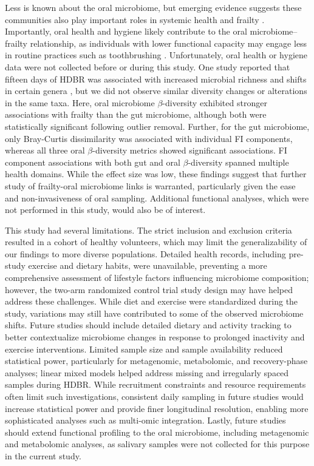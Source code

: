 \documentclass[preprint,12pt,authoryear]{elsarticle}
\begin{document}
    Less is known about the oral microbiome, but emerging evidence suggests these communities also play important roles in systemic health and frailty \citep{scannapiecoOralInflammationInfection2016, heOralMicrobiomeDiversity2015, declercqOralMicrobialSignatures2024}. Importantly, oral health and hygiene likely contribute to the oral microbiome–frailty relationship, as individuals with lower functional capacity may engage less in routine practices such as toothbrushing \citep{dibelloOralFrailtyIts2021}. Unfortunately, oral health or hygiene data were not collected before or during this study. One study reported that fifteen days of HDBR was associated with increased microbial richness and shifts in certain genera \citep{zhuEffect15Days2024}, but we did not observe similar diversity changes or alterations in the same taxa. Here, oral microbiome $\beta$-diversity exhibited stronger associations with frailty than the gut microbiome, although both were statistically significant following outlier removal. Further, for the gut microbiome, only Bray-Curtis dissimilarity was associated with individual FI components, whereas all three oral $\beta$-diversity metrics showed significant associations. FI component associations with both gut and oral $\beta$-diversity spanned multiple health domains. While the effect size was low, these findings suggest that further study of frailty-oral microbiome links is warranted, particularly given the ease and non-invasiveness of oral sampling. Additional functional analyses, which were not performed in this study, would also be of interest.
    
    This study had several limitations. The strict inclusion and exclusion criteria resulted in a cohort of healthy volunteers, which may limit the generalizability of our findings to more diverse populations. Detailed health records, including pre-study exercise and dietary habits, were unavailable, preventing a more comprehensive assessment of lifestyle factors influencing microbiome composition; however, the two-arm randomized control trial study design may have helped address these challenges. While diet and exercise were standardized during the study, variations may still have contributed to some of the observed microbiome shifts. Future studies should include detailed dietary and activity tracking to better contextualize microbiome changes in response to prolonged inactivity and exercise interventions. Limited sample size and sample availability reduced statistical power, particularly for metagenomic, metabolomic, and recovery-phase analyses; linear mixed models helped address missing and irregularly spaced samples during HDBR. While recruitment constraints and resource requirements often limit such investigations, consistent daily sampling in future studies would increase statistical power and provide finer longitudinal resolution, enabling more sophisticated analyses such as multi-omic integration. Lastly, future studies should extend functional profiling to the oral microbiome, including metagenomic and metabolomic analyses, as salivary samples were not collected for this purpose in the current study.
\end{document}
